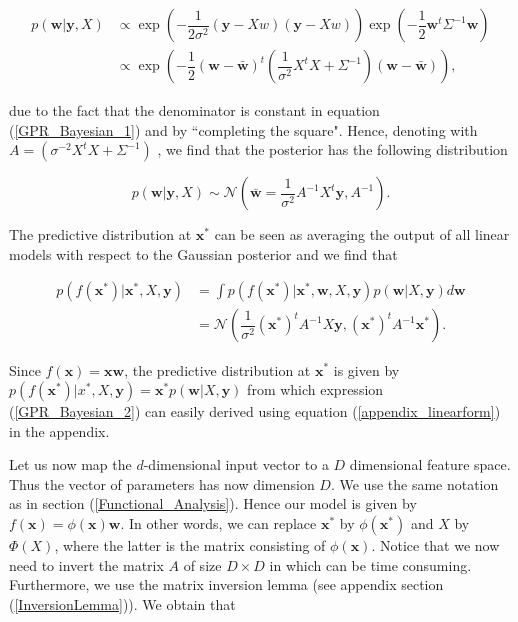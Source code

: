 \documentclass[12pt,a4paper,oneside]{book}
\begin{document}
\begin{align}
p(\bm{w}|\bm{y},X) &\propto \exp\left(- \dfrac{1}{2 \sigma^2}(\bm{y} - X w)(\bm{y} - X w) \right) \exp \left(- \dfrac{1}{2} \bm{w}^t \Sigma^{-1} \bm{w} \right) \nonumber \\
&\propto \exp \left(- \dfrac{1}{2}(\bm{w} - \bar{\bm{w}})^t \left( \dfrac{1}{\sigma^2} X^t X + \Sigma^{-1} \right) (\bm{w} - \bar{\bm{w}}) \right),
\end{align}

due to the fact that the denominator is constant in equation (\ref{GPR_Bayesian_1}) and by ``completing the square". Hence, denoting with $A = (\sigma^{-2} X^tX + \Sigma^{-1})$ , we find that the posterior has the following distribution 

\begin{equation}
p(\bm{w}|\bm{y},X) \sim \mathcal{N} (\bar{\bm{w}} = \dfrac{1}{\sigma^2} A^{-1} X^t \bm{y}, A^{-1}).
\end{equation}

The predictive distribution at $\bm{x}^{\ast}$ can be seen as averaging the output of all linear models with respect to the Gaussian posterior and we find that

\begin{align}\label{GPR_Bayesian_2}
p(f(\bm{x}^{\ast})|\bm{x}^{\ast},X,\bm{y}) &= \int p(f(\bm{x}^{\ast})|\bm{x}^{\ast},\bm{w}, X, \bm{y}) p (\bm{w} | X , \bm{y}) d\bm{w} \nonumber \\
&= \mathcal{N}\left( \dfrac{1}{\sigma^2} \left(\bm{x}^{\ast}\right)^t A^{-1} X \bm{y}, \left(\bm{x}^{\ast}\right)^t A^{-1}  \bm{x}^{\ast} \right).
\end{align}

Since $f(\bm{x}) = \bm{x} \bm{w}$, the predictive distribution at $\bm{x}^{\ast}$ is given by $p(f(\bm{x}^{\ast})|x^{\ast},X,\bm{y}) = \bm{x}^{\ast} p(\bm{w}|X,\bm{y})$ from which expression (\ref{GPR_Bayesian_2}) can easily derived using equation (\ref{appendix_linearform}) in the appendix.

Let us now map the $d$-dimensional input vector to a $D$ dimensional feature space. Thus the vector of parameters has now dimension $D$. We use the same notation as in section (\ref{Functional_Analysis}). Hence our model is given by $f(\bm{x}) = \phi(\bm{x}) \bm{w}$. In other words, we can replace $\bm{x}^{\ast}$ by $\phi(\bm{x}^{\ast})$ and $X$ by $\Phi(X)$, where the latter is the matrix consisting of $\phi(\bm{x})$.  Notice that we now need to invert the matrix $A$ of size $D \times D$ in which can be time consuming.  Furthermore, we use the matrix inversion lemma (see appendix section (\ref{InversionLemma})). We obtain that 
\end{document}
